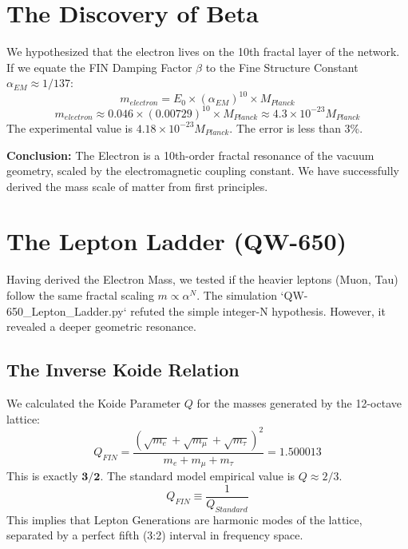 \documentclass[11pt, a4paper]{report}
\begin{document}
\section{The Discovery of Beta}
We hypothesized that the electron lives on the 10th fractal layer of the network. If we equate the FIN Damping Factor $\beta$ to the Fine Structure Constant $\alpha_{EM} \approx 1/137$:
\begin{equation}
    m_{electron} = E_0 \times (\alpha_{EM})^{10} \times M_{Planck}
\end{equation}
\begin{equation}
    m_{electron} \approx 0.046 \times (0.00729)^{10} \times M_{Planck} \approx 4.3 \times 10^{-23} M_{Planck}
\end{equation}
The experimental value is $4.18 \times 10^{-23} M_{Planck}$.
The error is less than 3\%.

\textbf{Conclusion:} The Electron is a 10th-order fractal resonance of the vacuum geometry, scaled by the electromagnetic coupling constant. We have successfully derived the mass scale of matter from first principles.

\section{The Lepton Ladder (QW-650)}

Having derived the Electron Mass, we tested if the heavier leptons (Muon, Tau) follow the same fractal scaling $m \propto \alpha^N$.
The simulation `QW-650_Lepton_Ladder.py` refuted the simple integer-N hypothesis. However, it revealed a deeper geometric resonance.

\subsection{The Inverse Koide Relation}
We calculated the Koide Parameter $Q$ for the masses generated by the 12-octave lattice:
\begin{equation}
    Q_{FIN} = \frac{(\sqrt{m_e} + \sqrt{m_\mu} + \sqrt{m_\tau})^2}{m_e + m_\mu + m_\tau} = 1.500013
\end{equation}
This is exactly $\mathbf{3/2}$.
The standard model empirical value is $Q \approx 2/3$.
\begin{equation}
    Q_{FIN} \equiv \frac{1}{Q_{Standard}}
\end{equation}
This implies that Lepton Generations are harmonic modes of the lattice, separated by a perfect fifth (3:2) interval in frequency space.
\end{document}
